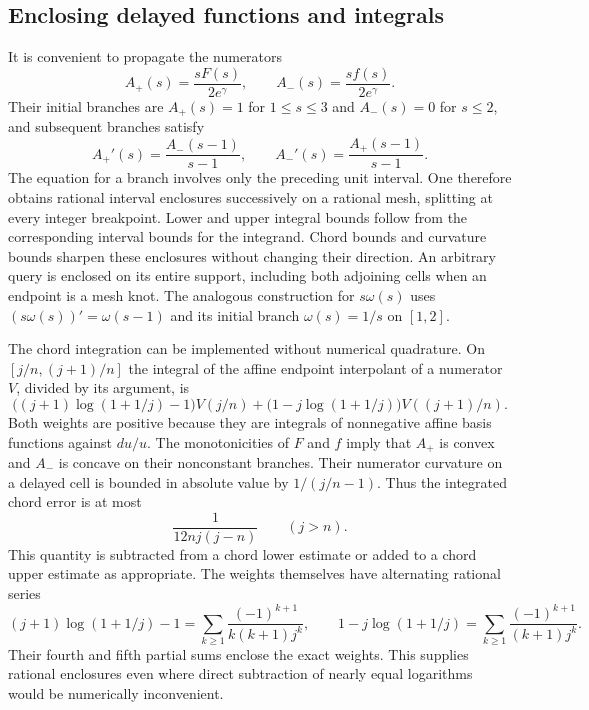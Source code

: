 \subsection{Enclosing delayed functions and integrals}
It is convenient to propagate the numerators
\[
 A_+(s)=\frac{sF(s)}{2e^\gamma},\qquad
 A_-(s)=\frac{sf(s)}{2e^\gamma}.
\]
Their initial branches are $A_+(s)=1$ for $1\le s\le3$ and
$A_-(s)=0$ for $s\le2$, and subsequent branches satisfy
\[
 A_+'(s)=\frac{A_-(s-1)}{s-1},\qquad
 A_-'(s)=\frac{A_+(s-1)}{s-1}.
\]
The equation for a branch involves only the preceding unit interval.
One therefore obtains rational interval enclosures successively on a
rational mesh, splitting at every integer breakpoint.  Lower and upper
integral bounds follow from the corresponding interval bounds for the
integrand.  Chord bounds and curvature bounds sharpen these enclosures
without changing their direction.  An arbitrary query is enclosed on
its entire support, including both adjoining cells when an endpoint
is a mesh knot.  The analogous construction for $s\omega(s)$ uses
$(s\omega(s))'=\omega(s-1)$ and its initial branch
$\omega(s)=1/s$ on $[1,2]$.

The chord integration can be implemented without numerical
quadrature.  On $[j/n,(j+1)/n]$ the integral of the affine
endpoint interpolant of a numerator $V$, divided by its argument,
is
\[
 \bigl((j+1)\log(1+1/j)-1\bigr)V(j/n)
 +\bigl(1-j\log(1+1/j)\bigr)V((j+1)/n).
\]
Both weights are positive because they are integrals of
nonnegative affine basis functions against $du/u$.
The monotonicities of $F$ and $f$ imply that $A_+$ is convex
and $A_-$ is concave on their nonconstant branches.
Their numerator curvature on a delayed cell is bounded
in absolute value by $1/(j/n-1)$.  Thus the integrated
chord error is at most
\[
 \frac{1}{12nj(j-n)}\qquad(j>n).
\]
This quantity is subtracted from a chord lower estimate
or added to a chord upper estimate as appropriate.
The weights themselves have alternating rational series
\[
 (j+1)\log(1+1/j)-1
  =\sum_{k\ge1}\frac{(-1)^{k+1}}{k(k+1)j^k},\qquad
 1-j\log(1+1/j)
  =\sum_{k\ge1}\frac{(-1)^{k+1}}{(k+1)j^k}.
\]
Their fourth and fifth partial sums enclose the exact
weights.  This supplies rational enclosures even where
direct subtraction of nearly equal logarithms would be
numerically inconvenient.

